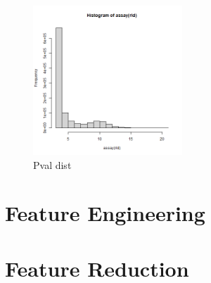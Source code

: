 \begin{figure}[ht]
	\begin{center}
		\includegraphics[width = 0.5\textwidth]{Fig/rld_hist_full.png}
	\end{center}
	\caption{Pval dist}\label{fig:dge_pval}
\end{figure}

\section{Feature Engineering}



\section{Feature Reduction}

